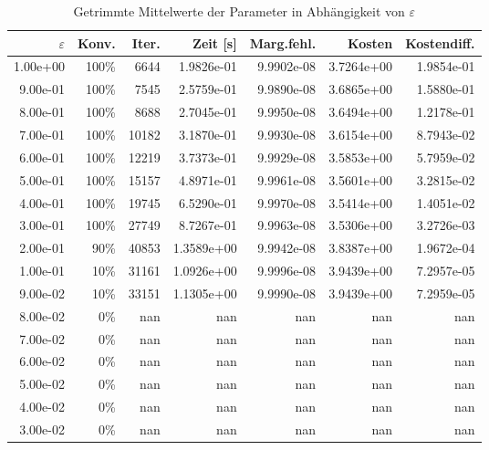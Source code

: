 \begin{table}[htbp]
\caption{Getrimmte Mittelwerte der Parameter in Abhängigkeit von $\varepsilon$}
\label{tab:Parametertest256_1}
\small
\centering
{}
\begin{tabular}{rrrrrrr}
\toprule
$\varepsilon$ & Konv. & Iter. & Zeit [s] & Marg.fehl. & Kosten & Kostendiff. \\
\midrule
1.00e+00 & 100\% & 6644 & 1.9826e-01 & 9.9902e-08 & 3.7264e+00 & 1.9854e-01 \\
9.00e-01 & 100\% & 7545 & 2.5759e-01 & 9.9890e-08 & 3.6865e+00 & 1.5880e-01 \\
8.00e-01 & 100\% & 8688 & 2.7045e-01 & 9.9950e-08 & 3.6494e+00 & 1.2178e-01 \\
7.00e-01 & 100\% & 10182 & 3.1870e-01 & 9.9930e-08 & 3.6154e+00 & 8.7943e-02 \\
6.00e-01 & 100\% & 12219 & 3.7373e-01 & 9.9929e-08 & 3.5853e+00 & 5.7959e-02 \\
5.00e-01 & 100\% & 15157 & 4.8971e-01 & 9.9961e-08 & 3.5601e+00 & 3.2815e-02 \\
4.00e-01 & 100\% & 19745 & 6.5290e-01 & 9.9970e-08 & 3.5414e+00 & 1.4051e-02 \\
3.00e-01 & 100\% & 27749 & 8.7267e-01 & 9.9963e-08 & 3.5306e+00 & 3.2726e-03 \\
2.00e-01 & 90\% & 40853 & 1.3589e+00 & 9.9942e-08 & 3.8387e+00 & 1.9672e-04 \\
1.00e-01 & 10\% & 31161 & 1.0926e+00 & 9.9996e-08 & 3.9439e+00 & 7.2957e-05 \\
9.00e-02 & 10\% & 33151 & 1.1305e+00 & 9.9990e-08 & 3.9439e+00 & 7.2959e-05 \\
8.00e-02 & 0\% & nan & nan & nan & nan & nan \\
7.00e-02 & 0\% & nan & nan & nan & nan & nan \\
6.00e-02 & 0\% & nan & nan & nan & nan & nan \\
5.00e-02 & 0\% & nan & nan & nan & nan & nan \\
4.00e-02 & 0\% & nan & nan & nan & nan & nan \\
3.00e-02 & 0\% & nan & nan & nan & nan & nan \\
\bottomrule
\end{tabular}
\end{table}
